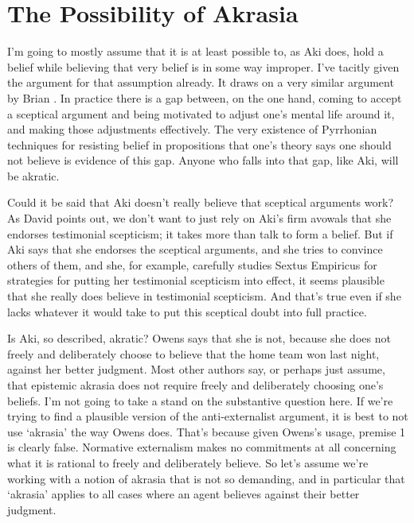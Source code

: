 \section{The Possibility of Akrasia}
\label{thepossibilityofakrasia}

I'm going to mostly assume that it is at least possible to, as \gls{Aki} does, hold a belief while believing that very belief is in some way improper. I've tacitly given the argument for that assumption already. It draws on a very similar argument by Brian \citet{Ribeiro2011}. In practice there is a gap between, on the one hand, coming to accept a sceptical argument and being motivated to adjust one's mental life around it, and making those adjustments effectively. The very existence of Pyrrhonian techniques for resisting belief in propositions that one's theory says one should not believe is evidence of this gap. Anyone who falls into that gap, like \gls{Aki}, will be akratic.

Could it be said that \gls{Aki} doesn't really believe that sceptical arguments work? As David \citet{Owens2002} points out, we don't want to just rely on \gls{Aki}'s firm avowals that she endorses testimonial scepticism; it takes more than talk to form a belief. But if \gls{Aki} says that she endorses the sceptical arguments, and she tries to convince others of them, and she, for example, carefully studies Sextus Empiricus for strategies for putting her testimonial scepticism into effect, it seems plausible that she really does believe in testimonial scepticism. And that's true even if she lacks whatever it would take to put this sceptical doubt into full practice.

Is \gls{Aki}, so described, akratic? Owens says that she is not, because she does not freely and deliberately choose to believe that the home team won last night, against her better judgment. Most other authors say, or perhaps just assume, that epistemic akrasia does not require freely and deliberately choosing one's beliefs. I'm not going to take a stand on the substantive question here. If we're trying to find a plausible version of the anti-externalist argument, it is best to not use `akrasia' the way Owens does. That's because given Owens's usage, premise 1 is clearly false. Normative externalism makes no commitments at all concerning what it is rational to freely and deliberately believe. So let's assume we're working with a notion of akrasia that is not so demanding, and in particular that `akrasia' applies to all cases where an agent believes against their better judgment.

